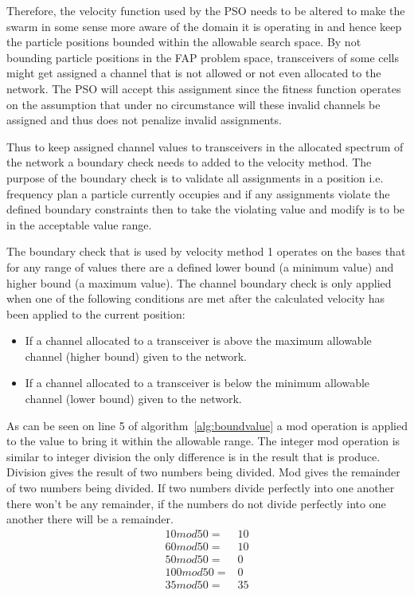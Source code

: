 Therefore, the velocity function used by the PSO needs to be altered to make the swarm in some sense more aware of the domain it is operating in and hence keep the particle positions bounded within the allowable search space. By not bounding particle positions in the FAP problem space, transceivers of some cells might get assigned a channel that is not allowed or not even allocated to the network. The PSO will accept this assignment since the fitness function operates on the assumption that under no circumstance will these invalid channels be assigned and thus does not penalize invalid assignments.

Thus to keep assigned channel values to transceivers in the allocated spectrum of the network a boundary check needs to added to the velocity method. The purpose of the boundary check is to validate all assignments in a position i.e. frequency plan a particle currently occupies and if any assignments violate the defined boundary constraints then to take the violating value and modify is to be in the acceptable value range.

The boundary check that is used by velocity method 1 operates on the bases that for any range of values there are a defined lower bound (a minimum value) and higher bound (a maximum value). The channel boundary check is only applied when one of the following conditions are met after the calculated velocity has been applied to the current position:
\begin{itemize}
\item If a channel allocated to a transceiver is above the maximum allowable channel (higher bound) given to the network. 
\item If a channel allocated to a transceiver is below the minimum allowable channel (lower bound) given to the network.
\end{itemize}

As can be seen on line 5 of algorithm~\ref{alg:boundvalue} a mod operation is applied to the value to bring it within the allowable range. The integer mod operation is similar to integer division the only difference is in the result that is produce. Division gives the result of two numbers being divided. Mod gives the remainder of two numbers being divided. If two numbers divide perfectly into one another there won't be any remainder, if the numbers do not divide perfectly into one another there will be a remainder. 
\begin{align}
	10 mod 50 =& 10 \\
	60 mod 50 =& 10 \\
	50 mod 50 =& 0 \\
	100 mod 50 =& 0 \\
	35 mod 50 =& 35 
\end{align}

